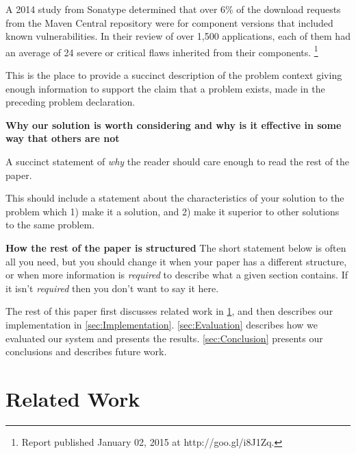 \documentclass[pdf,bookmarks,colorlinks=true]{IEEEtran}
\begin{document}
A 2014 study from Sonatype determined that over 6\% of the download requests from the Maven Central repository were for component versions that included known vulnerabilities. In their review of over 1,500 applications, each of them had an average of 24 severe or critical flaws inherited from their components. \footnote{Report published January 02, 2015 at http://goo.gl/i8J1Zq.}

This is the place to provide a succinct description of the problem context
giving enough information to support the claim that a problem exists, made in
the preceding problem declaration.



\textbf{Why our solution is worth considering and why is it effective
in some way that others are not}

A succinct statement of {\em why} the reader should care enough to read the
rest of the paper.

This should include a statement about the characteristics of your solution to
the problem which 1) make it a solution, and 2) make it superior to other
solutions to the same problem.



\textbf{How the rest of the paper is structured}
The short statement below is often all you need, but you should change it when
your paper has a different structure, or when more information is {\em
required} to describe what a given section contains. If it isn't {\em required}
then you don't want to say it here.


The rest of this paper first discusses related work in
\ref{sec:RelatedWork}, and then describes our implementation in
\ref{sec:Implementation}. \ref{sec:Evaluation} describes how we evaluated
our system and presents the results. \ref{sec:Conclusion} presents our
conclusions and describes future work.

\section{Related Work}
\label{sec:RelatedWork}
\end{document}
